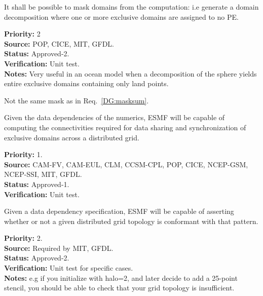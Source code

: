  \label{DG:masklayout}

It shall be possible to mask domains from the computation: i.e
generate a domain decomposition where one or more exclusive
domains are assigned to no PE.

\begin{reqlist}
{\bf Priority:} 2 \\
{\bf Source:} POP, CICE, MIT, GFDL. \\
{\bf Status:} Approved-2. \\
{\bf Verification:} Unit test. \\
{\bf Notes:} Very useful in an ocean model when a decomposition
  of the sphere yields entire exclusive domains containing only
  land points.

  Not the same mask as in Req.~\ref{DG:masksum}.
\end{reqlist}


Given the data dependencies of the numerics, ESMF will be capable of
computing the connectivities required for data sharing and
synchronization of exclusive domains across a distributed grid.


\begin{reqlist}
{\bf Priority:} 1. \\ 
{\bf Source:} CAM-FV, CAM-EUL, CLM, CCSM-CPL, POP, CICE, NCEP-GSM, NCEP-SSI, MIT, GFDL. \\
{\bf Status:} Approved-1. \\
{\bf Verification:} Unit test.
\end{reqlist}


Given a data dependency specification, ESMF will be capable of
asserting whether or not a given distributed grid topology is
conformant with that pattern.

\begin{reqlist}
{\bf Priority:} 2. \\ 
{\bf Source:} Required by MIT, GFDL. \\
{\bf Status:} Approved-2. \\
{\bf Verification:} Unit test for specific cases.\\
{\bf Notes:} e.g if you initialize with halo=2, and later decide to
add a 25-point stencil, you should be able to check that your grid
topology is insufficient.
\end{reqlist}

